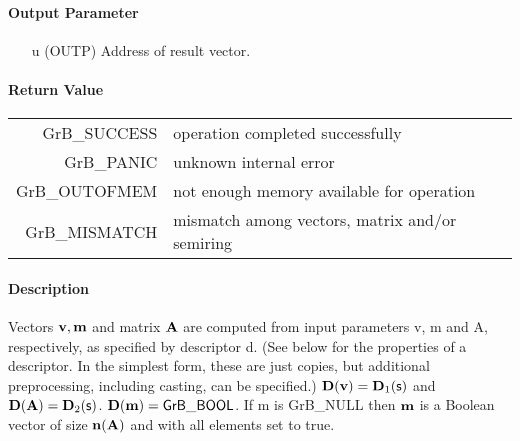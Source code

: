 
\paragraph{Output Parameter}

\begin{itemize}
	\item[{\sf u}] ({\sf OUTP}) Address of result vector.
\end{itemize}

\paragraph{Return Value}


\begin{tabular}{rl} 
{\sf GrB\_SUCCESS} 	& operation completed successfully \\
{\sf GrB\_PANIC}	& unknown internal error \\
{\sf GrB\_OUTOFMEM}	& not enough memory available for operation \\
{\sf GrB\_MISMATCH}	& mismatch among vectors, matrix and/or semiring
\end{tabular}


\paragraph{Description}

Vectors ${\bf v}, {\bf m}$ and matrix ${\bf A}$ are computed from
input parameters {\sf v}, {\sf m} and {\sf A}, respectively, as specified
by descriptor {\sf d}. (See below for the properties of a descriptor. In
the simplest form, these are just copies, but additional preprocessing,
including casting, can be specified.)  $\bold{D}({\bf v}) =
\bold{D}_1({\sf s})$ and $\bold{D}({\bf A}) = \bold{D}_2({\sf s})$.
$\bold{D}({\bf m}) = {\sf GrB\_BOOL}$.  If {\sf m} is {\sf GrB\_NULL}
then ${\bf m}$ is a Boolean vector of size $\bold{n}({\bf A})$
and with all elements set to {\sf true}.

